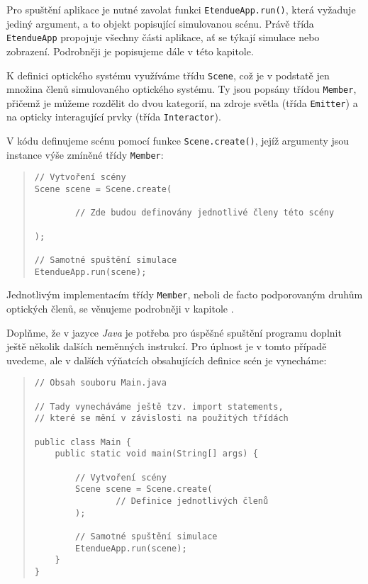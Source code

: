 Pro spuštění aplikace je nutné zavolat funkci \texttt{EtendueApp.run()}, která vyžaduje jediný argument, a to objekt popisující simulovanou scénu. Právě třída \texttt{EtendueApp} propojuje všechny části aplikace, ať se týkají simulace nebo zobrazení. Podrobněji je popisujeme dále v této kapitole.

K definici optického systému využíváme třídu \texttt{Scene}, což je v podstatě jen množina členů simulovaného optického systému. Ty jsou popsány třídou \texttt{Member}, přičemž je můžeme rozdělit do dvou kategorií, na zdroje světla (třída \texttt{Emitter}) a na opticky interagující prvky (třída \texttt{Interactor}).

V kódu definujeme scénu pomocí funkce \texttt{Scene.create()}, jejíž argumenty jsou instance výše zmíněné třídy \texttt{Member}:

\begin{minipage}{\textwidth}\begin{quote}\begin{lstlisting}
// Vytvoření scény
Scene scene = Scene.create(

        // Zde budou definovány jednotlivé členy této scény

);

// Samotné spuštění simulace
EtendueApp.run(scene);
\end{lstlisting}\end{quote}\end{minipage}

Jednotlivým implementacím třídy \texttt{Member}, neboli de facto podporovaným druhům optických členů, se věnujeme podrobněji v kapitole .

Doplňme, že v jazyce \emph{Java} je potřeba pro úspěšné spuštění programu doplnit ještě několik dalších neměnných instrukcí. Pro úplnost je v tomto případě uvedeme, ale v dalších výňatcích obsahujících definice scén je vynecháme:

\begin{minipage}{\textwidth}\begin{quote}\begin{lstlisting}
// Obsah souboru Main.java

// Tady vynecháváme ještě tzv. import statements,
// které se mění v závislosti na použitých třídách

public class Main {
    public static void main(String[] args) {

        // Vytvoření scény
        Scene scene = Scene.create(
                // Definice jednotlivých členů
        );

        // Samotné spuštění simulace
        EtendueApp.run(scene);
    }
}
\end{lstlisting}\end{quote}\end{minipage}


